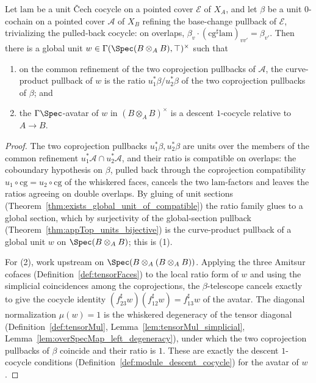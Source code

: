 \begin{theorem}
  \label{thm:exists_kernelDescentUnit}
  \leanok
  Let \(\mathrm{lam}\) be a unit \v Cech cocycle on a pointed cover \(\mathcal E\) of \(X_A\),
  and let \(\beta\) be a unit \(0\)-cochain on a pointed cover \(\mathcal A\) of \(X_B\) refining
  the base-change pullback of \(\mathcal E\), trivializing the pulled-back cocycle: on overlaps,
  \(\beta_v \cdot (\mathrm{cg}^{\sharp}\mathrm{lam})_{vv'} = \beta_{v'}\). Then there is a global
  unit \(w \in \Gamma(\Spec(B \otimes_A B), \top)^{\times}\) such that
  \begin{enumerate}
    \item on the common refinement of the two coprojection pullbacks of \(\mathcal A\), the
      curve-product pullback of \(w\) is the ratio \(u_1^{*}\beta / u_2^{*}\beta\) of the two
      coprojection pullbacks of \(\beta\); and
    \item the \(\Gamma\Spec\)-avatar of \(w\) in \((B \otimes_A B)^{\times}\) is a descent
      \(1\)-cocycle relative to \(A \to B\).
  \end{enumerate}
\end{theorem}
\begin{proof}
  \leanok
  The two coprojection pullbacks \(u_1^{*}\beta, u_2^{*}\beta\) are units over the members of
  the common refinement \(u_1^{*}\mathcal A \cap u_2^{*}\mathcal A\), and their ratio is
  compatible on overlaps: the coboundary hypothesis on \(\beta\), pulled back through the
  coprojection compatibility \(u_1 \circ \mathrm{cg} = u_2 \circ \mathrm{cg}\) of the whiskered
  faces, cancels the two \(\mathrm{lam}\)-factors and leaves the ratios agreeing on double
  overlaps.  By gluing of unit sections (Theorem~\ref{thm:exists_global_unit_of_compatible})
  the ratio family glues to a global section, which by surjectivity of the global-section
  pullback (Theorem~\ref{thm:appTop_units_bijective}) is the curve-product pullback of a global
  unit \(w\) on \(\Spec(B \otimes_A B)\); this is (1).

  For (2), work upstream on \(\Spec(B \otimes_A (B \otimes_A B))\).  Applying the three Amitsur
  cofaces (Definition~\ref{def:tensorFaces}) to the local ratio form of \(w\) and using the
  simplicial coincidences among the coprojections, the \(\beta\)-telescope cancels exactly to
  give the cocycle identity \((f_{23}^{\sharp} w)(f_{12}^{\sharp} w) = f_{13}^{\sharp} w\) of the
  avatar.  The diagonal normalization \(\mu(w) = 1\) is the whiskered degeneracy of the tensor
  diagonal (Definition~\ref{def:tensorMul}, Lemma~\ref{lem:tensorMul_simplicial},
  Lemma~\ref{lem:overSpecMap_left_degeneracy}), under which the two coprojection pullbacks of
  \(\beta\) coincide and their ratio is \(1\).  These are exactly the descent \(1\)-cocycle
  conditions (Definition~\ref{def:module_descent_cocycle}) for the avatar of \(w\).
\end{proof}

